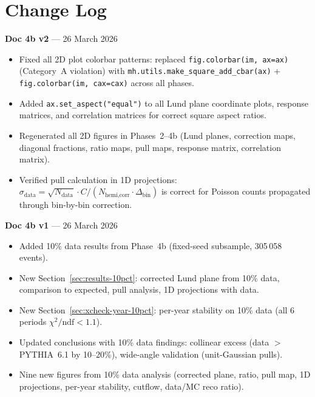 \documentclass[11pt,a4paper]{article}
\begin{document}
\tableofcontents
\clearpage

\section*{Change Log}

\textbf{Doc 4b v2} --- 26 March 2026
\begin{itemize}
\item Fixed all 2D plot colorbar patterns: replaced \texttt{fig.colorbar(im, ax=ax)} (Category~A violation) with \texttt{mh.utils.make\_square\_add\_cbar(ax)} + \texttt{fig.colorbar(im, cax=cax)} across all phases.
\item Added \texttt{ax.set\_aspect("equal")} to all Lund plane coordinate plots, response matrices, and correlation matrices for correct square aspect ratios.
\item Regenerated all 2D figures in Phases~2--4b (Lund planes, correction maps, diagonal fractions, ratio maps, pull maps, response matrix, correlation matrix).
\item Verified pull calculation in 1D projections: $\sigma_\text{data} = \sqrt{N_\text{data}} \cdot C / (N_\text{hemi,corr} \cdot \Delta_\text{bin})$ is correct for Poisson counts propagated through bin-by-bin correction.
\end{itemize}

\medskip

\textbf{Doc 4b v1} --- 26 March 2026
\begin{itemize}
\item Added 10\% data results from Phase~4b (fixed-seed subsample, 305\,058 events).
\item New Section~\ref{sec:results-10pct}: corrected Lund plane from 10\% data, comparison to expected, pull analysis, 1D projections with data.
\item New Section~\ref{sec:xcheck-year-10pct}: per-year stability on 10\% data (all 6 periods $\chi^2/\text{ndf} < 1.1$).
\item Updated conclusions with 10\% data findings: collinear excess (data $>$ PYTHIA~6.1 by 10--20\%), wide-angle validation (unit-Gaussian pulls).
\item Nine new figures from 10\% data analysis (corrected plane, ratio, pull map, 1D projections, per-year stability, cutflow, data/MC reco ratio).
\end{itemize}
\end{document}
